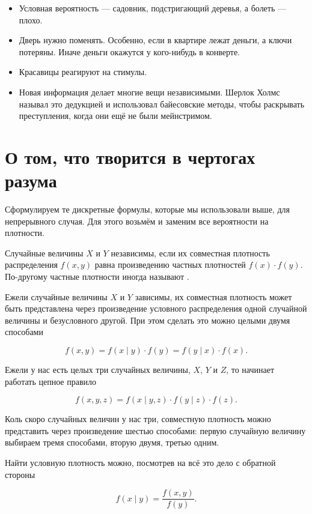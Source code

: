 \begin{itemize}
	\item  Условная вероятность --- садовник, подстригающий деревья, а болеть --- плохо.
	\item  Дверь нужно поменять. Особенно, если в квартире лежат деньги, а ключи потеряны. Иначе деньги окажутся у кого-нибудь в конверте.
	\item  Красавицы реагируют на стимулы.
	\item  Новая информация делает многие вещи независимыми. Шерлок Холмс называл это дедукцией и использовал байесовские методы, чтобы раскрывать преступления, когда они ещё не были мейнстримом. 
\end{itemize}

\section{О том, что творится в чертогах разума}

Сформулируем те дискретные формулы, которые мы использовали выше, для непрерывного случая. Для этого возьмём и заменим все вероятности на плотности.

Случайные величины $X$ и $Y$ независимы, если их совместная плотность распределения $f(x,y)$ равна произведению частных плотностей $f(x) \cdot f(y)$. По-другому частные плотности иногда называют .

Ежели случайные величины $X$ и $Y$ зависимы, их совместная плотность может быть представлена через произведение условного распределения одной случайной величины и безусловного другой. При этом сделать это можно целыми двумя способами

\begin{equation}\label{f1}
 f(x,y) = f(x \mid y) \cdot f(y) = f(y \mid x) \cdot f(x).
\end{equation}

Ежели у нас есть целых три случайных величины, $X$, $Y$ и $Z$, то начинает работать цепное правило

\[ f(x,y,z) = f(x \mid y,z) \cdot f(y \mid z) \cdot f(z).\]

Коль скоро случайных величин у нас три, совместную плотность можно представить через произведение шестью способами: первую случайную величину выбираем тремя способами, вторую двумя, третью одним.

Найти условную плотность можно, посмотрев на всё это дело с обратной стороны

\begin{equation}\label{f2}
f(x \mid y)  =  \frac{f(x,y)}{f(y)}.
\end{equation}

